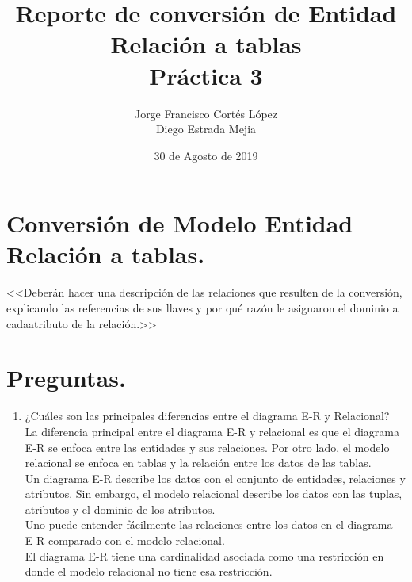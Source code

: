\documentclass{article}
\title{Reporte de conversión de Entidad Relación a tablas\\
Práctica 3}
\author{Jorge Francisco Cortés López\\
Diego Estrada Mejia}
\date{30 de Agosto de 2019}
\begin{document}
\maketitle

\section{Conversión de Modelo Entidad Relación a tablas.}
<<Deberán hacer una descripción de las relaciones que resulten de la conversión, explicando las referencias de sus llaves y por qué razón le asignaron el dominio a cadaatributo de la relación.>>

\section{Preguntas.}
\begin{enumerate}
    \item ¿Cuáles son las principales diferencias entre el diagrama E-R y Relacional?\\
    La diferencia principal entre el diagrama E-R y relacional es que el diagrama E-R se enfoca entre las entidades y sus relaciones. Por otro lado, el modelo relacional se enfoca en tablas y la relación entre los datos de las tablas.\\
    Un diagrama E-R describe los datos con el conjunto de entidades, relaciones y atributos. Sin embargo, el modelo relacional describe los datos con las tuplas, atributos y el dominio de los atributos.\\
    Uno puede entender fácilmente las relaciones entre los datos en el diagrama E-R comparado con el modelo relacional.\\
    El diagrama E-R tiene una cardinalidad asociada como una restricción en donde el modelo relacional no tiene esa restricción.
    

\end{enumerate}
\end{document}
